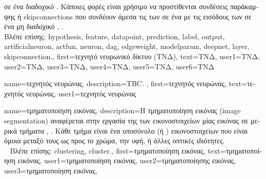 {{		 \foreignlanguage{greek}{σε ένα διαδοχικό} . \foreignlanguage{greek}{Κάποιες φορές είναι χρήσιμο να 
		προστίθενται συνδέσεις παράκαμψης ή} \glspl{skipconnection} \foreignlanguage{greek}{που συνδέουν άμεσα τις}  
		\foreignlanguage{greek}{των}  \foreignlanguage{greek}{σε ένα}  \foreignlanguage{greek}{με τις εισόδους 
		των}  \foreignlanguage{greek}{σε ένα μη διαδοχικό}  \cite{Goodfellow-et-al-2016}, \cite{HeResidual2016}.
		\\
		\foreignlanguage{greek}{Βλέπε επίσης:} \gls{hypothesis}, \gls{feature}, \gls{datapoint}, \gls{prediction}, \gls{label}, \gls{output}, 
		\gls{artificialneuron}, \gls{actfun}, \gls{neuron}, \gls{dag}, \gls{edgeweight}, \gls{modelparam}, \gls{deepnet}, \gls{layer}, \gls{skipconnection}.},
	first={\foreignlanguage{greek}{τεχνητό νευρωνικό δίκτυο (ΤΝΔ)}},
	text={\foreignlanguage{greek}{ΤΝΔ}},
	user1={\foreignlanguage{greek}{ΤΝΔ}}, %
	user2={\foreignlanguage{greek}{ΤΝΔ}}, %
	user3={\foreignlanguage{greek}{ΤΝΔ}}, %
	user4={\foreignlanguage{greek}{ΤΝΔ}}, %
	user5={\foreignlanguage{greek}{ΤΝΔ}}, %
	user6={\foreignlanguage{greek}{ΤΝΔ}} %
}

{name={\foreignlanguage{greek}{τεχνητός νευρώνας}},
	description={TBC. },
	first={\foreignlanguage{greek}{τεχνητός νευρώνας}},
	text={\foreignlanguage{greek}{τεχνητός νευρώνας}},
	user1={\foreignlanguage{greek}{τεχνητός νευρώνας}} %
}

{name={\foreignlanguage{greek}{τμηματοποίηση εικόνας}}, 
	description={\foreignlanguage{greek}{Η τμηματοποίηση εικόνας} (image segmentation) 
		\foreignlanguage{greek}{αναφέρεται στην εργασία της}  \foreignlanguage{greek}{των εικονοστοιχείων μίας
		εικόνας σε μερικά τμήματα} \cite{JungLocalGraphClustering}, \cite{Wren1997}. \foreignlanguage{greek}{Κάθε τμήμα είναι ένα υποσύνολο
		(ή} ) \foreignlanguage{greek}{εικονοστοιχείων που είναι όμοια μεταξύ τους ως προς το χρώμα, την υφή, ή άλλες 
		οπτικές ιδιότητες.} 
		\\ 
 		\foreignlanguage{greek}{Βλέπε επίσης:} \gls{clustering}, \gls{cluster}.}, 
 	first={\foreignlanguage{greek}{τμηματοποίηση εικόνας}}, 
 	text={\foreignlanguage{greek}{τμηματοποίηση εικόνας}},
	user1={\foreignlanguage{greek}{τμηματοποίηση εικόνας}}, %
	user2={\foreignlanguage{greek}{τμηματοποίησης εικόνας}}, %
	user3={\foreignlanguage{greek}{τμηματοποίηση εικόνας}}, %
}

